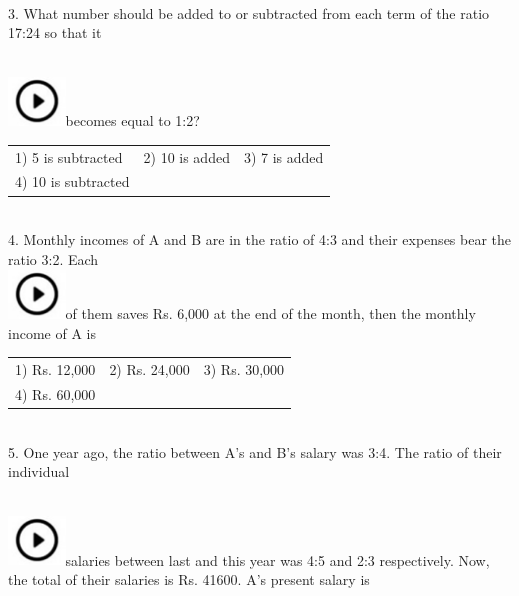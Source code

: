 \documentclass{article}
\begin{document}
\noindent 

\noindent \\   3.   What number should be added to or subtracted from each term of the ratio 17:24 so that it

\noindent  
	\noindent \\ \includegraphics*[width=0.60in, height=0.52in]{images/image1}becomes equal to 1:2?

\noindent \begin{tabular}{p{1.7in} p{1.6in} p{1.6in}} \\ 
 1) 5 is subtracted                                          &  2) 10 is added

\noindent 

\noindent &  3) 7 is added                                                 \\
4) 10 is subtracted \\
\end{tabular}

\noindent \\  4.   Monthly incomes of A and B are in the ratio of 4:3 and their expenses bear the ratio 3:2. Each  
	\noindent \\ \includegraphics*[width=0.60in, height=0.52in]{images/image1}of them saves Rs. 6,000 at the end of the month, then the monthly income of A is

\noindent \begin{tabular}{p{1.7in} p{1.6in} p{1.6in}} \\ 
 1) Rs. 12,000              &  2) Rs. 24,000       &  3) Rs. 30,000        \\
4) Rs. 60,000 \\
\end{tabular}

\noindent 

\noindent 

\noindent  \\  5.   One year ago, the ratio between A's and B's salary was 3:4. The ratio of their individual

\noindent  
	\noindent \\ \includegraphics*[width=0.60in, height=0.52in]{images/image1}salaries between last and this year was 4:5 and 2:3 respectively. Now, the total of their salaries is Rs. 41600. A's present salary is
\end{document}
